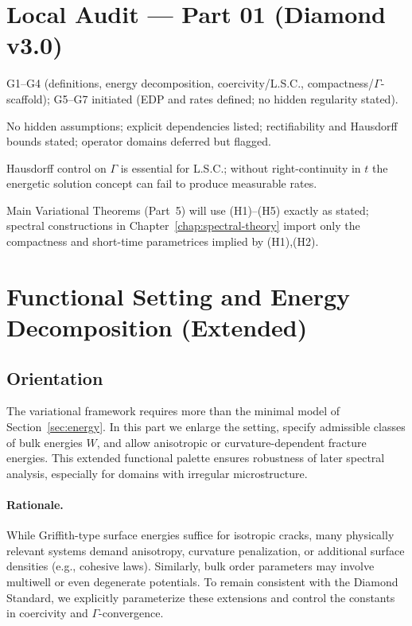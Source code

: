 \section*{Local Audit — Part 01 (Diamond v3.0)}
\begin{description}[leftmargin=2.4em]
  \item[Goals covered:] G1--G4 (definitions, energy decomposition, coercivity/L.S.C., compactness/$\Gamma$-scaffold); G5--G7 initiated (EDP and rates defined; no hidden regularity stated).
  \item[Invariants:] No hidden assumptions; explicit dependencies listed; rectifiability and Hausdorff bounds stated; operator domains deferred but flagged.
  \item[Limitations (Sharpness):] Hausdorff control on $\Gamma$ is essential for L.S.C.; without right-continuity in $t$ the energetic solution concept can fail to produce measurable rates.
  \item[Forward link:] Main Variational Theorems (Part~5) will use (H1)--(H5) exactly as stated; spectral constructions in Chapter~\ref{chap:spectral-theory} import only the compactness and short-time parametrices implied by (H1),(H2).
\end{description}

\section{Functional Setting and Energy Decomposition (Extended)}\label{sec:var-functional}

\subsection{Orientation}
The variational framework requires more than the minimal model of Section~\ref{sec:energy}.
In this part we enlarge the setting, specify admissible classes of bulk energies $W$, and allow anisotropic or curvature-dependent fracture energies.
This extended functional palette ensures robustness of later spectral analysis, especially for domains with irregular microstructure.

\paragraph{Rationale.}
While Griffith-type surface energies suffice for isotropic cracks, many physically relevant systems demand anisotropy, curvature penalization, or additional surface densities (e.g., cohesive laws).
Similarly, bulk order parameters may involve multiwell or even degenerate potentials.
To remain consistent with the Diamond Standard, we explicitly parameterize these extensions and control the constants in coercivity and $\Gamma$-convergence.

